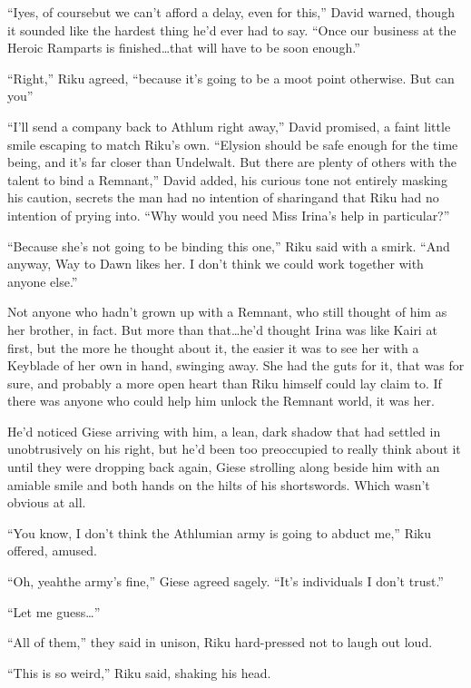 ``I\textemdash yes, of course\textemdash but we can't afford a delay, even for this,'' David warned, though it sounded like the hardest thing he'd ever had to say. ``Once our business at the Heroic Ramparts is finished\ldots that will have to be soon enough.''

``Right,'' Riku agreed, ``because it's going to be a moot point otherwise. But can you\textemdash''

``I'll send a company back to Athlum right away,'' David promised, a faint little smile escaping to match Riku's own. ``Elysion should be safe enough for the time being, and it's far closer than Undelwalt. But there are plenty of others with the talent to bind a Remnant,'' David added, his curious tone not entirely masking his caution, secrets the man had no intention of sharing\textemdash and that Riku had no intention of prying into. ``Why would you need Miss Irina's help in particular?''

``Because she's not going to be binding this one,'' Riku said with a smirk. ``And anyway, Way to Dawn likes her. I don't think we could work together with anyone else.''

Not anyone who hadn't grown up with a Remnant, who still thought of him as her brother, in fact. But more than that\ldots he'd thought Irina was like Kairi at first, but the more he thought about it, the easier it was to see her with a Keyblade of her own in hand, swinging away. She had the guts for it, that was for sure, and probably a more open heart than Riku himself could lay claim to. If there was anyone who could help him unlock the Remnant world, it was her.

He'd noticed Giese arriving with him, a lean, dark shadow that had settled in unobtrusively on his right, but he'd been too preoccupied to really think about it until they were dropping back again, Giese strolling along beside him with an amiable smile and both hands on the hilts of his shortswords. Which wasn't obvious at all.

``You know, I don't think the Athlumian army is going to abduct me,'' Riku offered, amused.

``Oh, yeah\textemdash the army's fine,'' Giese agreed sagely. ``It's individuals I don't trust.''

``Let me guess\ldots''

``All of them,'' they said in unison, Riku hard-pressed not to laugh out loud.

``This is so weird,'' Riku said, shaking his head.

